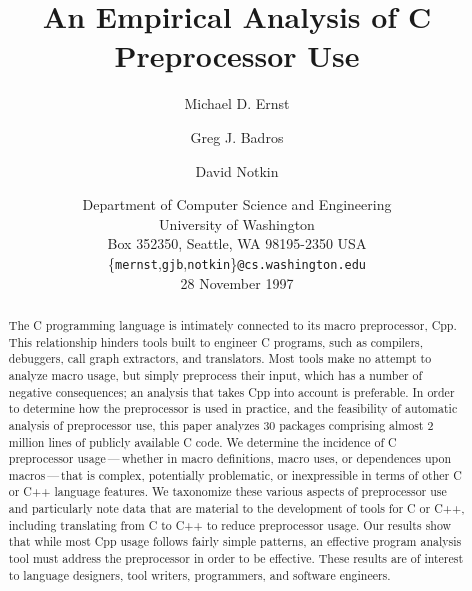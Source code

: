 \documentclass[10pt]{article}
\def\numpackages{30}
\def\numlinesalmost{almost 2 million}
\begin{document}
% 


\title{An Empirical Analysis of C Preprocessor Use}

\author{Michael D. Ernst \and Greg J. Badros \and David Notkin}

\date{%
Department of Computer Science and Engineering \\
University of Washington \\
Box 352350, Seattle, WA  98195-2350  USA \\
{\small \{{\tt mernst},{\tt gjb},{\tt notkin}\}{\tt @cs.washington.edu}} \\
28 November 1997}  

\maketitle

\begin{abstract}
  The C programming language is intimately connected to its macro
  preprocessor, Cpp.  This relationship hinders tools built to engineer C
  programs, such as compilers, debuggers, call graph extractors, and
  translators.  Most tools make no attempt to analyze macro usage, but
  simply preprocess their input, which has a number of negative
  consequences; an analysis that takes Cpp into account is preferable.  In
  order to determine how the preprocessor is used in practice, and the
  feasibility of automatic analysis of preprocessor use, this paper
  analyzes {\numpackages} packages comprising {\numlinesalmost} lines of publicly
  available C code.  We determine the incidence of C preprocessor
  usage\,---\,whether in macro definitions, macro uses, or dependences upon
  macros\,---\,that is complex, potentially problematic, or inexpressible
  in terms of other C or C++ language features.  We taxonomize these
  various aspects of preprocessor use and particularly note data that are
  material to the development of tools for C or C++, including translating
  from C to C++ to reduce preprocessor usage.  Our results show that while
  most Cpp usage follows fairly simple patterns, an effective program
  analysis tool must address the preprocessor in order to be effective.
  These results are of interest to language designers, tool writers,
  programmers, and software engineers.
\end{abstract}

\bigskip
\end{document}
